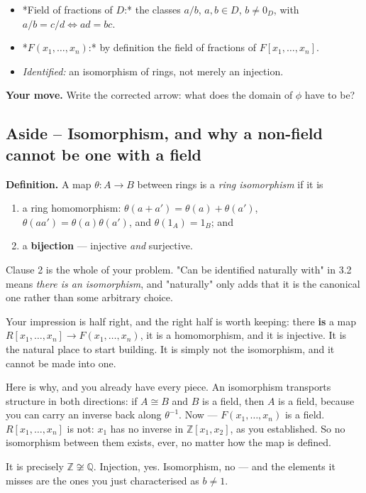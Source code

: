 \documentclass[11pt]{article}
\begin{document}
\begin{itemize}
  \item *Field of fractions of $D$:* the classes $a/b$, $a,b \in D$, $b \neq 0_D$, with $a/b = c/d \iff ad = bc$.
  \item *$F(x_1,\ldots,x_n)$:* by definition the field of fractions of $F[x_1,\ldots,x_n]$.
  \item \emph{Identified:} an isomorphism of rings, not merely an injection.
\end{itemize}

\textbf{Your move.} Write the corrected arrow: what does the domain of $\phi$ have to be?


\subsection*{Aside -- Isomorphism, and why a non-field cannot be one with a field}
\textbf{Definition.} A map $\theta : A \to B$ between rings is a \emph{ring isomorphism} if it is

\begin{enumerate}
  \item a ring homomorphism: $\theta(a + a') = \theta(a) + \theta(a')$, $\theta(aa') = \theta(a)\theta(a')$, and $\theta(1_A) = 1_B$; and
  \item a \textbf{bijection} --- injective \emph{and} surjective.
\end{enumerate}

Clause 2 is the whole of your problem. "Can be identified naturally with" in 3.2 means \emph{there is an isomorphism}, and "naturally" only adds that it is the canonical one rather than some arbitrary choice.

Your impression is half right, and the right half is worth keeping: there \textbf{is} a map $R[x_1,\ldots,x_n] \to F(x_1,\ldots,x_n)$, it is a homomorphism, and it is injective. It is the natural place to start building. It is simply not the isomorphism, and it cannot be made into one.

Here is why, and you already have every piece. An isomorphism transports structure in both directions: if $A \cong B$ and $B$ is a field, then $A$ is a field, because you can carry an inverse back along $\theta^{-1}$. Now --- $F(x_1,\ldots,x_n)$ is a field. $R[x_1,\ldots,x_n]$ is not: $x_1$ has no inverse in $\mathbb{Z}[x_1,x_2]$, as you established. So no isomorphism between them exists, ever, no matter how the map is defined.

It is precisely $\mathbb{Z} \not\cong \mathbb{Q}$. Injection, yes. Isomorphism, no --- and the elements it misses are the ones you just characterised as $b \neq 1$.
\end{document}
